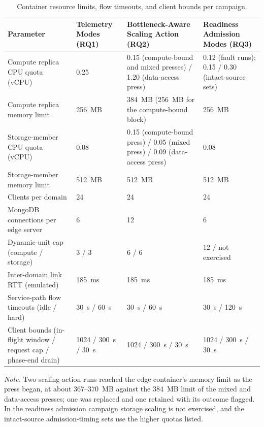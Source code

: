﻿\documentclass[12pt,reqno,twoside]{amsbook}
\begin{document}
{\begin{table}[H]
    \centering
    \caption{Container resource limits, flow timeouts, and client bounds per campaign.}
    \label{tab:app_config_resources}
    \footnotesize
    \setlength{\tabcolsep}{4pt}
    \begin{tabular}{p{} p{} p{} p{}}
        \toprule
        Parameter & Telemetry Modes (RQ1) & Bottleneck-Aware Scaling Action (RQ2) & Readiness Admission Modes (RQ3) \\
        \midrule
        Compute replica CPU quota (vCPU) & 0.25 & 0.15 (compute-bound and mixed presses) / 1.20 (data-access press) & 0.12 (fault runs); 0.15 / 0.30 (intact-source sets) \\
        Compute replica memory limit & 256~MB & 384~MB (256~MB for the compute-bound block) & 256~MB \\
        Storage-member CPU quota (vCPU) & 0.08 & 0.15 (compute-bound press) / 0.05 (mixed press) / 0.09 (data-access press) & 0.08 \\
        Storage-member memory limit & 512~MB & 512~MB & 512~MB \\
        Clients per domain & 24 & 24 & 24 \\
        MongoDB connections per edge server & 6 & 12 & 6 \\
        Dynamic-unit cap (compute / storage) & 3 / 3 & 6 / 6 & 12 / not exercised \\
        Inter-domain link RTT (emulated) & 185~ms & 185~ms & 185~ms \\
        Service-path flow timeouts (idle / hard) & 30~s / 60~s & 30~s / 60~s & 30~s / 120~s \\
        Client bounds (in-flight window / request cap / phase-end drain) & 1024 / 300~s / 30~s & 1024 / 300~s / 30~s & 1024 / 300~s / 30~s \\
        \bottomrule
    \end{tabular}
\end{table}
{\footnotesize\noindent\textit{Note.} Two scaling-action runs reached the edge
container's memory limit as the press began, at about 367--370~MB against the
384~MB limit of the mixed and data-access presses; one was replaced and one
retained with its outcome flagged. In
the readiness admission campaign storage scaling is not exercised, and the
intact-source admission-timing sets use the higher quotas listed.\par}

}
\end{document}
